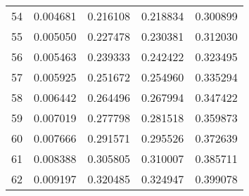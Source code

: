 \begin{center}
\begin{tabular}{|c|c|c|c|c|}
    54    & 0.004681   & 0.216108     & 0.218834     & 0.300899 \\ 
    55    & 0.005050   & 0.227478     & 0.230381     & 0.312030 \\ 
    56    & 0.005463   & 0.239333     & 0.242422     & 0.323495 \\ 
    57    & 0.005925   & 0.251672     & 0.254960     & 0.335294 \\ 
    58    & 0.006442   & 0.264496     & 0.267994     & 0.347422 \\ 
    59    & 0.007019   & 0.277798     & 0.281518     & 0.359873 \\ 
    60    & 0.007666   & 0.291571     & 0.295526     & 0.372639 \\ 
    61    & 0.008388   & 0.305805     & 0.310007     & 0.385711 \\ 
    62    & 0.009197   & 0.320485     & 0.324947     & 0.399078 \\
\end{tabular}
\end{center}

